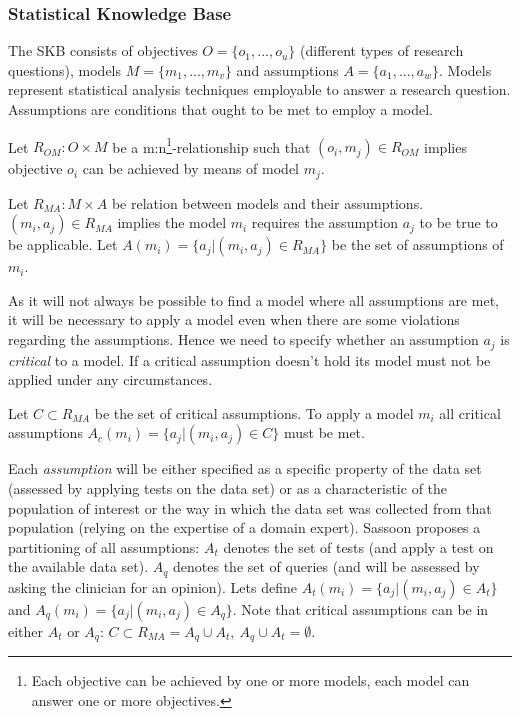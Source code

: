 \subsubsection*{Statistical Knowledge Base}


The \gls{SKB} consists of objectives $O=\{o_1, ..., o_u\}$ (different types of research questions), models $M=\{m_1, ..., m_v\}$ and assumptions $A = \{a_1, ..., a_w\}$. Models represent statistical analysis techniques employable to answer a research question. Assumptions are conditions that ought to be met to employ a model.

\begin{definition}
	Let $R_{OM}: O \times M$ be a m:n\footnote{Each objective can be achieved by one or more models, each model can answer one or more objectives.}-relationship such that $(o_i, m_j)\in R_{OM}$ implies objective $o_i$ can be achieved by means of model $m_j$. 
\end{definition}

\begin{definition}
	Let $R_{MA}: M \times A$ be relation between models and their assumptions. $(m_i, a_j)\in R_{MA}$ implies  the model $m_i$ requires the assumption $a_j$ to be true to be applicable. Let $A(m_i) = \{a_j | (m_i, a_j) \in R_{MA}\}$ be the set of assumptions of $m_i$.
\end{definition}

As it will not always be possible to find a model where all assumptions are met, it will be necessary to apply a model even when there are some violations regarding the assumptions. Hence we need to specify whether an assumption $a_j$ is \textit{critical} to a model. If a critical assumption doesn't hold its model must not be applied under any circumstances.

\begin{definition}
Let $C \subset R_{MA}$ be the set of critical assumptions. To apply a model $m_i$ all critical assumptions $A_c(m_i) = \{a_j | (m_i, a_j) \in C\}$ must be met.
\end{definition}

Each \textit{assumption} will be either specified as a specific property of the data set (assessed by applying tests on the data set) or as a characteristic of the population of interest or the way in which the data set was collected from that population (relying on the expertise of a domain expert). Sassoon proposes a partitioning of all assumptions: $A_t$ denotes the set of tests (and apply a test on the available data set). $A_q$ denotes the set of queries (and will be assessed by asking the clinician for an opinion). Lets define $A_t(m_i)= \{a_j| (m_i, a_j) \in A_t\}$ and $A_q(m_i)= \{a_j| (m_i, a_j) \in A_q\}$. Note that critical assumptions can be in either $A_t$ or $A_q$: $C \subset R_{MA} = A_q \cup A_t, ~A_q \cup A_t = \emptyset$. 

